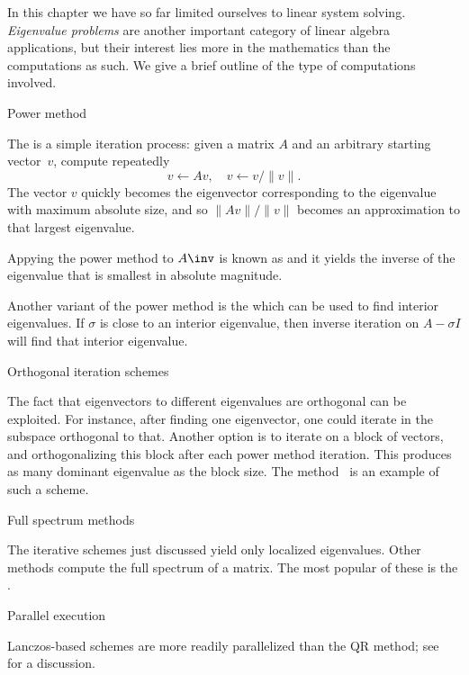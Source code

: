 
In this chapter we have so far limited ourselves to linear system
solving. \emph{Eigenvalue problems} are another important category of
linear algebra applications, but their interest lies more in the
mathematics than the computations as such.
We give a brief outline of the type of computations involved.

 {Power method}

The  is a simple iteration process:
%
given a matrix $A$ and an arbitrary starting vector~$v$, compute
repeatedly
\[ v\leftarrow Av,\quad v\leftarrow v/\|v\|. \]
The vector $v$ quickly becomes the eigenvector corresponding to the
eigenvalue with maximum absolute size, and so $\|Av\|/\|v\|$ becomes
an approximation to that largest eigenvalue.

Appying the power method to $A\inv$ is known as
%
and it yields the inverse of the eigenvalue that is smallest in
absolute magnitude.

Another variant of the power method is the
%
which can be used to find interior eigenvalues. If $\sigma$ is close
to an interior eigenvalue, then inverse iteration on $A-\sigma I$ will
find that interior eigenvalue.

 {Orthogonal iteration schemes}

The fact that eigenvectors to different eigenvalues are orthogonal can
be exploited. For instance, after finding one eigenvector, one could
iterate in the subspace orthogonal to that. Another option is to
iterate on a block of vectors, and orthogonalizing this block after
each power method iteration. This produces as many dominant eigenvalue
as the block size. The 
method~\cite{leho:95} is an example of such a scheme.

 {Full spectrum methods}

The iterative schemes just discussed yield only localized eigenvalues.
Other methods compute the full spectrum of a matrix. The most popular
of these is the .

 {Parallel execution}

Lanczos-based schemes are more readily parallelized than the QR
method; see~\cite{berry:inria-svdpar} for a discussion.
